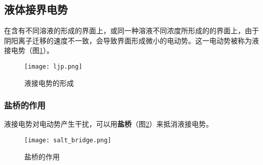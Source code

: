     \subsection{液体接界电势}

    在含有不同溶液的形成的界面上，或同一种溶液不同浓度所形成的的界面上，由于阴阳离子迁移的速度不一致，会导致界面形成微小的电动势。这一电动势被称为液接电势（图\ref{fig:ljp}）。

    \begin{figure}[h]
        \centering
        \texttt{[image: ljp.png]}
        \caption{液接电势的形成}
        \label{fig:ljp}
    \end{figure}

    \subsubsection{盐桥的作用}

    液接电势对电动势产生干扰，可以用\textbf{盐桥}（图\ref{fig:salt_bridge}）来抵消液接电势。


    \begin{figure}[h]
        \centering
        \texttt{[image: salt\_bridge.png]}
        \caption{盐桥的作用}
        \label{fig:salt_bridge}
    \end{figure}

  